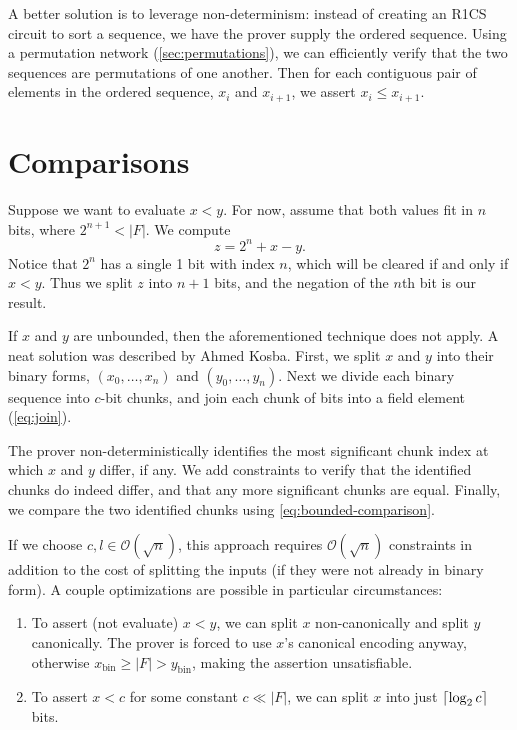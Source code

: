 \documentclass{article}
\DeclarePairedDelimiter\ceil{\lceil}{\rceil}
\begin{document}
A better solution is to leverage non-determinism: instead of creating an R1CS circuit to sort a sequence, we have the prover supply the ordered sequence. Using a permutation network (\autoref{sec:permutations}), we can efficiently verify that the two sequences are permutations of one another. Then for each contiguous pair of elements in the ordered sequence, $x_i$ and $x_{i + 1}$, we assert $x_i \le x_{i + 1}$.


\section{Comparisons} \label{sec:comparisons}

Suppose we want to evaluate $x < y$. For now, assume that both values fit in $n$ bits, where $2^{n + 1} < |F|$. We compute
\begin{equation} \label{eq:bounded-comparison}
  z = 2^n + x - y.
\end{equation}
Notice that $2^n$ has a single 1 bit with index $n$, which will be cleared if and only if $x < y$. Thus we split $z$ into $n + 1$ bits, and the negation of the $n$th bit is our result.

If $x$ and $y$ are unbounded, then the aforementioned technique does not apply. A neat solution was described by Ahmed Kosba. First, we split $x$ and $y$ into their binary forms, $(x_0, \dots, x_n)$ and $(y_0, \dots, y_n)$. Next we divide each binary sequence into $c$-bit chunks, and join each chunk of bits into a field element (\autoref{eq:join}).

The prover non-deterministically identifies the most significant chunk index at which $x$ and $y$ differ, if any. We add constraints to verify that the identified chunks do indeed differ, and that any more significant chunks are equal. Finally, we compare the two identified chunks using \autoref{eq:bounded-comparison}.

If we choose $c, l \in \mathcal{O}(\sqrt{n})$, this approach requires $\mathcal{O}(\sqrt{n})$ constraints in addition to the cost of splitting the inputs (if they were not already in binary form). A couple optimizations are possible in particular circumstances:
\begin{enumerate}
  \item To assert (not evaluate) $x < y$, we can split $x$ non-canonically and split $y$ canonically. The prover is forced to use $x$'s canonical encoding anyway, otherwise $x_\mathrm{bin} \ge |F| > y_\mathrm{bin}$, making the assertion unsatisfiable.
  \item To assert $x < c$ for some constant $c \ll |F|$, we can split $x$ into just $\ceil{\log_2 c}$ bits.
\end{enumerate}


{}

\end{document}
